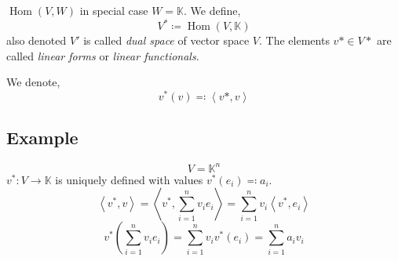 \documentclass[a4paper,landscape,twocolumn]{article}
\newcommand\functional[1]{\left\langle{#1}\right\rangle}
\theoremstyle{definition}
\DeclareMathOperator\Hom{Hom} %
\begin{document}
%
$\Hom(V,W)$ in special case $W = \mathbb K$. We define,
\[ V^* \coloneqq \Hom(V,\mathbb K) \]
also denoted $V'$ is called \emph{dual space} of vector space $V$.
The elements $v* \in V*$ are called \emph{linear forms} or \emph{linear functionals}.

We denote,
\[ v^*(v) \eqqcolon \functional{v*,v} \]

\subsection{Example}
\[ V = \mathbb K^n \]
$v^*: V \to \mathbb K$ is uniquely defined with values $v^*(e_i) \eqqcolon a_i$.
\[ \functional{v^*,v} = \functional{v^*, \sum_{i=1}^n v_i e_i} = \sum_{i=1}^n v_i \functional{v^*,e_i} \]
\[ v^*\left(\sum_{i=1}^n v_i e_i\right) = \sum_{i=1}^n v_i v^*(e_i) = \sum_{i=1}^n a_i v_i \]
\end{document}
